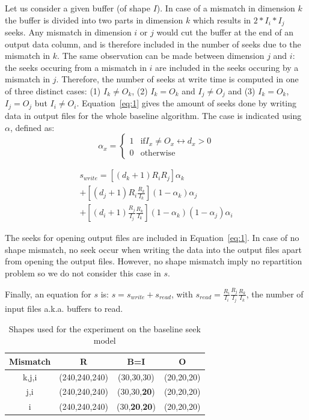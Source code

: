 \documentclass[conference]{IEEEtran}
\begin{document}
Let us consider a given buffer (of shape $I$). In case of a mismatch in
dimension $k$ the buffer is divided into two parts in dimension $k$ which results
in  $2*I_i*I_j$ seeks. Any mismatch in dimension $i$ or $j$ would cut the
buffer at the end of an output data column, and is therefore included in
the number of seeks due to the mismatch in $k$. The same observation can be made
between dimension $j$ and $i$: the seeks occuring from a mismatch in $i$ are
included in the seeks occuring by a mismatch in $j$. Therefore, the number of
seeks at write time is computed in one of three distinct cases:
(1) $I_k \neq O_k$, (2) $I_k = O_k$ and $I_j \neq O_j$ and (3) $I_k = O_k$,
$I_j = O_j$ but $I_i \neq O_i$. Equation~\ref{eq:1} gives the amount of seeks
done by writing data in output files for the whole baseline algorithm.
The case is indicated using $\alpha$, defined as: \\
$$\alpha_x = \begin{cases}
   1 & \mathrm{if} I_x \neq O_x \leftrightarrow d_x > 0 \\
   0 & \mathrm{otherwise}
\end{cases}$$

\begin{multline} \label{eq:1}
s_{write} = [(d_k+1)R_iR_j]\alpha_k \\ + [(d_j+1)R_i\frac{R_k}{I_k}](1-\alpha_k)\alpha_j \\ + [(d_i+1)\frac{R_j}{I_j}\frac{R_k}{I_k}](1-\alpha_k)(1-\alpha_j)\alpha_i
\end{multline}

The seeks for opening output files are included in Equation~\ref{eq:1}.
In case of no shape mismatch, no seek occur when writing the data into the output
files apart from opening the output files. However, no shape mismatch imply no
repartition problem so we do not consider this case in $s$.

Finally, an equation for $s$ is: $s = s_{write} + s_{read}$,
with $s_{read} = \frac{R_i}{I_i} \frac{R_j}{I_j} \frac{R_k}{I_k}$, the number of
input files a.k.a. buffers to read.


 \begin{table}[ht]
  \centering
  \caption{Shapes used for the experiment on the baseline seek model}

   \begin{tabular}[t]{c c c c}
   \hline
   Mismatch & R & B=I & O \\
     \hline\hline
     k,j,i & (240,240,240) & (30,30,30) & (20,20,20) \\
     \hline
     j,i & (240,240,240) & (30,30,\textbf{20}) & (20,20,20) \\
     \hline
     i & (240,240,240) & (30,\textbf{20},\textbf{20}) & (20,20,20) \\
     \hline
   \end{tabular}

   \label{tab:expseekmodel}

\end{table}
\end{document}
